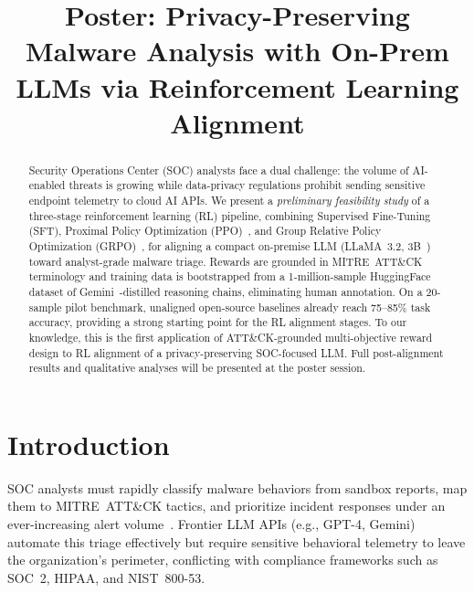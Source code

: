 \documentclass[conference,compsoc]{IEEEtran}
\begin{document}
\title{Poster: Privacy-Preserving Malware Analysis with On-Prem LLMs
       via Reinforcement Learning Alignment}

\author{%
}

\maketitle

\begin{abstract}
Security Operations Center (SOC) analysts face a dual challenge: the
volume of AI-enabled threats is growing while data-privacy regulations
prohibit sending sensitive endpoint telemetry to cloud AI APIs.
We present a \emph{preliminary feasibility study} of a three-stage
reinforcement learning (RL) pipeline, combining Supervised Fine-Tuning
(SFT), Proximal Policy Optimization (PPO)~\cite{ppo}, and Group Relative
Policy Optimization (GRPO)~\cite{grpo}, for aligning a compact on-premise
LLM (LLaMA~3.2, 3B~\cite{llama3}) toward analyst-grade malware triage.
Rewards are grounded in MITRE~ATT\&CK~\cite{mitre} terminology and
training data is bootstrapped from a 1-million-sample HuggingFace dataset
of Gemini~\cite{gemini}-distilled reasoning chains, eliminating human annotation.
On a 20-sample pilot benchmark, unaligned open-source baselines already
reach 75--85\% task accuracy, providing a strong starting point for the RL
alignment stages.
To our knowledge, this is the first application of ATT\&CK-grounded
multi-objective reward design to RL alignment of a privacy-preserving
SOC-focused LLM.
Full post-alignment results and qualitative analyses will be presented at
the poster session.
\end{abstract}

\section{Introduction}

SOC analysts must rapidly classify malware behaviors from sandbox reports,
map them to MITRE~ATT\&CK tactics, and prioritize incident responses
under an ever-increasing alert volume~\cite{ctibench}.
Frontier LLM APIs (e.g., GPT-4, Gemini) automate this triage effectively
but require sensitive behavioral telemetry to leave the organization's
perimeter, conflicting with compliance frameworks such as SOC~2, HIPAA,
and NIST~800-53.
\end{document}
